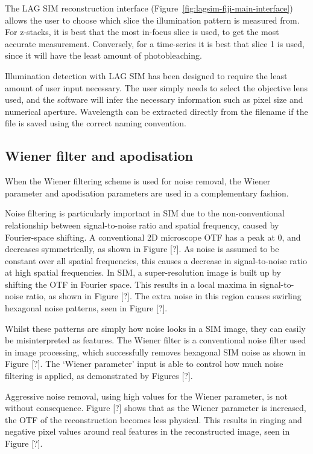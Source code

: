 The LAG SIM reconstruction interface (Figure~\ref{fig:lagsim-fiji-main-interface}) allows the user to choose which slice the illumination pattern is measured from. 
For z-stacks, it is best that the most in-focus slice is used, to get the most accurate measurement. 
Conversely, for a time-series it is best that slice 1 is used, since it will have the least amount of photobleaching. 

Illumination detection with LAG SIM has been designed to require the least amount of user input necessary. 
The user simply needs to select the objective lens used, and the software will infer the necessary information such as pixel size and numerical aperture. 
Wavelength can be extracted directly from the filename if the file is saved using the correct naming convention. 


\subsection{Wiener filter and apodisation}
When the Wiener filtering scheme is used for noise removal, the Wiener parameter and apodisation parameters are used in a complementary fashion. 

Noise filtering is particularly important in SIM due to the non-conventional relationship between signal-to-noise ratio and spatial frequency, caused by Fourier-space shifting. 
A conventional 2D microscope OTF has a peak at 0, and decreases symmetrically, as shown in Figure [?]. 
As noise is assumed to be constant over all spatial frequencies, this causes a decrease in signal-to-noise ratio at high spatial frequencies. 
In SIM, a super-resolution image is built up by shifting the OTF in Fourier space. 
This results in a local maxima in signal-to-noise ratio, as shown in Figure [?]. 
The extra noise in this region causes swirling hexagonal noise patterns, seen in Figure [?]. 

Whilst these patterns are simply how noise looks in a SIM image, they can easily be misinterpreted as features. 
The Wiener filter is a conventional noise filter used in image processing, which successfully removes hexagonal SIM noise as shown in Figure [?]. 
The `Wiener parameter' input is able to control how much noise filtering is applied, as demonstrated by Figures [?]. 

Aggressive noise removal, using high values for the Wiener parameter, is not without consequence. 
Figure [?] shows that as the Wiener parameter is increased, the OTF of the reconstruction becomes less physical. %
This results in ringing and negative pixel values around real features in the reconstructed image, seen in Figure [?].  %

